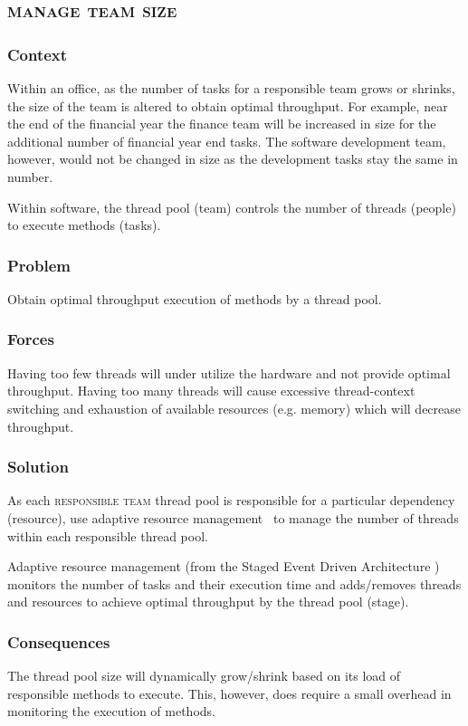 \documentclass[prodmode]{style/acmlarge}
\begin{document}
\subsection{\textsc{\textbf{manage team size}}}

\subsubsection*{Context} Within an office, as the number of tasks for a
responsible team grows or shrinks, the size of the team is altered to obtain
optimal throughput.  For example, near the end of the financial year the finance
team will be increased in size for the additional number of financial year end
tasks.  The software development team, however, would not be changed in size as
the development tasks stay the same in number.

Within software, the thread pool (team) controls the number of threads (people)
to execute methods (tasks).

\subsubsection*{\textbf{Problem}} Obtain optimal throughput execution of methods by a
thread pool.

\subsubsection*{Forces} Having too few threads will under utilize the hardware
and not provide optimal throughput.  Having too many threads will cause
excessive thread-context switching and exhaustion of available resources (e.g.
memory) which will decrease throughput.

\subsubsection*{\textbf{Solution}} As each \textsc{responsible team} thread pool
is responsible for a particular dependency (resource), use adaptive resource
management~\cite{seda} to manage the number of threads within each responsible
thread pool.

Adaptive resource management (from the Staged Event Driven Architecture
\cite{seda}) monitors the number of tasks and their execution time and
adds/removes threads and resources to achieve optimal throughput by the thread
pool (stage).

\subsubsection*{Consequences} The thread pool size will dynamically grow/shrink
based on its load of responsible methods to execute.  This, however, does
require a small overhead in monitoring the execution of methods.
\end{document}
